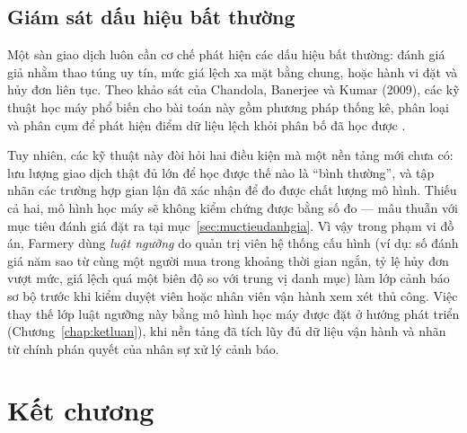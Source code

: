 \subsection{Giám sát dấu hiệu bất thường}
Một sàn giao dịch luôn cần cơ chế phát hiện các dấu hiệu bất thường: đánh giá giả nhằm thao túng uy tín, mức giá lệch xa mặt bằng chung, hoặc hành vi đặt và hủy đơn liên tục. Theo khảo sát của Chandola, Banerjee và Kumar (2009), các kỹ thuật học máy phổ biến cho bài toán này gồm phương pháp thống kê, phân loại và phân cụm để phát hiện điểm dữ liệu lệch khỏi phân bố đã học được \parencite{chandola2009anomaly}.

Tuy nhiên, các kỹ thuật này đòi hỏi hai điều kiện mà một nền tảng mới chưa có: lưu lượng giao dịch thật đủ lớn để học được thế nào là ``bình thường'', và tập nhãn các trường hợp gian lận đã xác nhận để đo được chất lượng mô hình. Thiếu cả hai, mô hình học máy sẽ không kiểm chứng được bằng số đo --- mâu thuẫn với mục tiêu đánh giá đặt ra tại mục~\ref{sec:muctieudanhgia}. Vì vậy trong phạm vi đồ án, Farmery dùng \emph{luật ngưỡng} do quản trị viên hệ thống cấu hình (ví dụ: số đánh giá năm sao từ cùng một người mua trong khoảng thời gian ngắn, tỷ lệ hủy đơn vượt mức, giá lệch quá một biên độ so với trung vị danh mục) làm lớp cảnh báo sơ bộ trước khi kiểm duyệt viên hoặc nhân viên vận hành xem xét thủ công. Việc thay thế lớp luật ngưỡng này bằng mô hình học máy được đặt ở hướng phát triển (Chương~\ref{chap:ketluan}), khi nền tảng đã tích lũy đủ dữ liệu vận hành và nhãn từ chính phán quyết của nhân sự xử lý cảnh báo.

\section{Kết chương}

